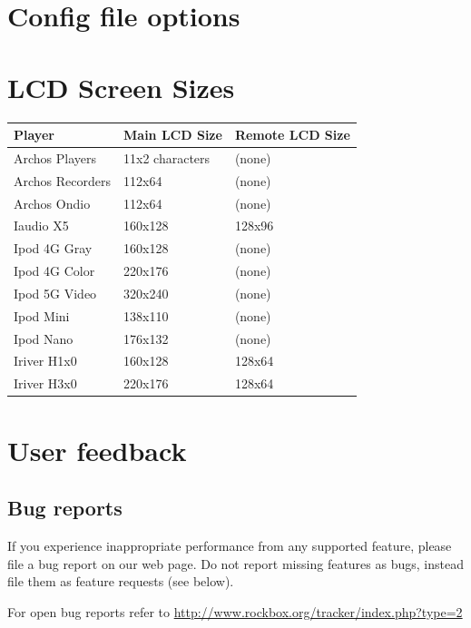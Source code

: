 

\chapter{\label{ref:config_file_options}Config file options}
\ifpdfoutput{}
{}

\chapter{LCD Screen Sizes}
\begin{center}
  \begin{tabularx}{.8\textwidth}{lXX}\toprule
    \textbf{Player} & \textbf{Main LCD Size} & \textbf{Remote LCD Size}\\\midrule
    Archos Players & 11x2 characters & (none)\\
    Archos Recorders & 112x64 & (none)\\ 
    Archos Ondio & 112x64 & (none)\\
    Iaudio X5 & 160x128 & 128x96\\
    Ipod 4G Gray & 160x128 & (none)\\
    Ipod 4G Color & 220x176 & (none)\\
    Ipod 5G Video & 320x240 & (none)\\
    Ipod Mini &138x110 & (none) \\
    Ipod Nano & 176x132 & (none)\\
    Iriver H1x0 & 160x128 & 128x64\\
    Iriver H3x0 & 220x176 & 128x64\\\bottomrule
  \end{tabularx}
\end{center}


\chapter{User feedback}
\section{Bug reports}
If you experience inappropriate performance from any supported feature,
please file a bug report on our web page. Do not report missing
features as bugs, instead file them as feature requests (see below).

For open bug reports refer to
\url{http://www.rockbox.org/tracker/index.php?type=2}

